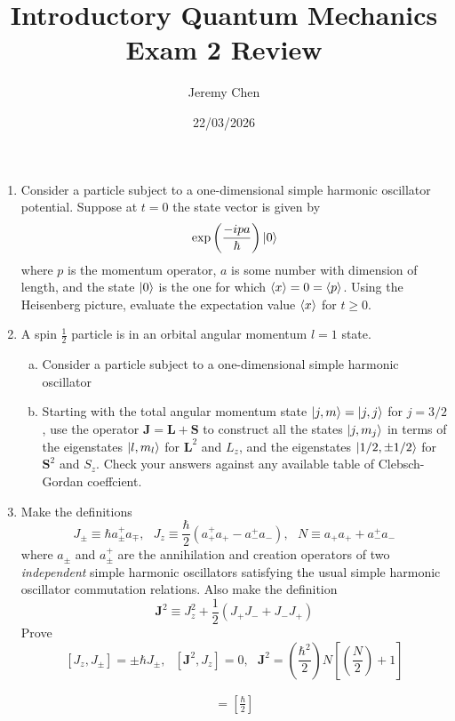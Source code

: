 \documentclass[10pt,letterpaper]{article}
\title{Introductory Quantum Mechanics Exam 2 Review}
\author{Jeremy Chen}
\date{22/03/2026}
\begin{document}
	\maketitle

\begin{enumerate}
	
\item Consider a particle subject to a one-dimensional simple harmonic oscillator potential. Suppose at $t = 0$ the state vector is given by
$$\exp\left( \frac{-ipa}{\hbar} \right)\ket{0}$$
where $p$ is the momentum operator, $a$ is some number with dimension of length, and the state $\ket{0}$ is the one for which $\braket{x} = 0 = \braket{p}$. Using the Heisenberg picture, evaluate the expectation value $\braket{x}$ for $t \geq 0$.  

\item A spin $\frac{1}{2}$ particle is in an orbital angular momentum $l = 1$ state.

\begin{enumerate}[a. ]

\item Consider a particle subject to a one-dimensional simple harmonic oscillator

\item Starting with the total angular momentum state $\ket{j, m} = \ket{j, j}$ for $j = 3/2$, use the operator $\textbf{J} = \textbf{L} + \textbf{S}$ to construct all the states $\ket{j, m_{j}}$ in terms of the eigenstates $\ket{l, m_{l}}$ for $\textbf{L}^{2}$ and $L_{z}$, and the eigenstates $\ket{1/2, \pm 1/2}$ for $\textbf{S}^{2}$ and $S_{z}$. Check your answers against any available table of Clebsch-Gordan coeffcient. 

\end{enumerate}

\item Make the definitions
$$J_{\pm} \equiv \hbar a_{\pm}^{+}a_{\mp},\ \ \ J_{z} \equiv \frac{\hbar}{2}(a_{+}^{+}a_{+} - a_{-}^{+}a_{-}),\ \ \ N \equiv a_{+}a_{+} + a_{-}^{+}a_{-}$$
where $a_{\pm}$ and $a_{\pm}^{+}$ are the annihilation and creation operators of two \textit{independent} simple harmonic oscillators satisfying the usual simple harmonic oscillator commutation relations. Also make the definition
$$\textbf{J}^{2} \equiv J_{z}^{2} + \frac{1}{2}(J_{+}J_{-} + J_{-}J_{+})$$
Prove
$$[J_{z}, J_{\pm}] = \pm\hbar J_{\pm},\ \ \ [\textbf{J}^{2}, J_{z}] = 0,\ \ \ \textbf{J}^{2} = \left( \frac{\hbar^{2}}{2} \right)N\left[ \left( \frac{N}{2} \right) + 1 \right]$$

\color{violet}
\begin{gather*}
[J_{z}, J_{+}] = [\frac{\hbar}{2}]
\end{gather*}
\color{black}

\end{enumerate}
\end{document}
